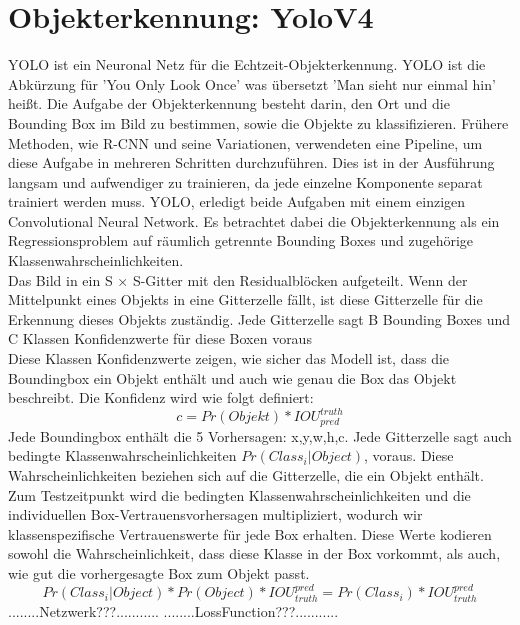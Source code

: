 \documentclass[conference]{IEEEtran}
\begin{document}
	\section{Objekterkennung: YoloV4}
	YOLO ist ein Neuronal Netz für die Echtzeit-Objekterkennung. YOLO ist die Abkürzung für 'You Only Look Once' was übersetzt 'Man sieht nur einmal hin' heißt. Die Aufgabe der Objekterkennung besteht darin, den Ort und die Bounding Box im Bild zu bestimmen, sowie die Objekte zu klassifizieren. Frühere Methoden, wie R-CNN und seine Variationen, verwendeten eine Pipeline, um diese Aufgabe in mehreren Schritten durchzuführen. Dies ist in der Ausführung langsam und aufwendiger zu trainieren, da jede einzelne Komponente separat trainiert werden muss. YOLO, erledigt beide Aufgaben mit einem einzigen Convolutional Neural Network. Es betrachtet dabei die Objekterkennung als ein Regressionsproblem auf räumlich getrennte Bounding Boxes und zugehörige Klassenwahrscheinlichkeiten.\cite{b1}\\
	Das Bild in ein S × S-Gitter mit den Residualblöcken aufgeteilt. Wenn der Mittelpunkt eines Objekts in eine Gitterzelle fällt, ist diese Gitterzelle für die Erkennung dieses Objekts zuständig. Jede Gitterzelle sagt B Bounding Boxes und C Klassen Konfidenzwerte für diese Boxen voraus \cite{b1}\\
	Diese Klassen Konfidenzwerte zeigen, wie sicher das Modell ist, dass die Boundingbox ein Objekt enthält und auch wie genau die Box das Objekt beschreibt. Die Konfidenz wird wie folgt definiert:
	\[ c = Pr(Objekt) * IOU_{pred}^{truth} \]
	Jede Boundingbox enthält die 5 Vorhersagen: x,y,w,h,c.
	Jede Gitterzelle sagt auch bedingte Klassenwahrscheinlichkeiten $Pr(Class_{i}|Object)$, voraus.  Diese Wahrscheinlichkeiten beziehen sich auf die Gitterzelle, die ein Objekt enthält.
	Zum Testzeitpunkt wird die bedingten Klassenwahrscheinlichkeiten und die individuellen Box-Vertrauensvorhersagen multipliziert, wodurch wir klassenspezifische Vertrauenswerte für jede Box erhalten.  Diese Werte kodieren sowohl die Wahrscheinlichkeit, dass diese Klasse in der Box vorkommt, als auch, wie gut die vorhergesagte Box zum Objekt passt.
	\[ Pr(Class_{i}|Object)*Pr(Object)*IOU_{truth}^{pred}= Pr(Class_{i})*IOU_{truth}^{pred} \]
	........Netzwerk???...........
	........LossFunction???...........
	
\end{document}
